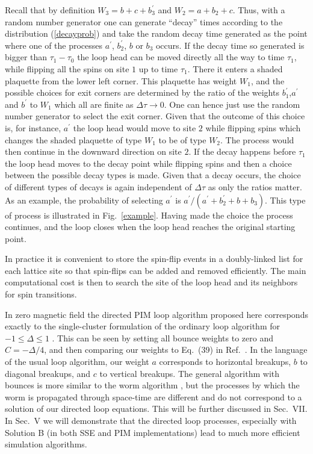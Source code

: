 \documentclass[10pt,pre,aps,twocolumn,showpacs,superscriptaddress,
floatfix]{revtex4}
\newcommand{\Deltatau}{\Delta \tau}
\begin{document}
Recall that by definition $W_3=b+c+b^\prime_3$ and $W_2=a+b_2+c$. 
Thus, with a random number generator one can generate ``decay'' times 
according to the distribution (\ref{decayprob})  and take the random decay 
time generated as the point where one of the processes $a^\prime$, 
$b^\prime_2$, $b$ or $b_3$ occurs. If the decay time so generated is bigger 
than $\tau_1-\tau_0$ the loop head can be moved directly all the way 
to time $\tau_1$, while flipping all the spins on site $1$ up to time 
$\tau_1$. There it enters a shaded plaquette from the lower left corner. 
This plaquette has weight $W_1$, and the possible choices for exit corners 
are determined by the ratio of the weights $b^\prime_1$,$a^\prime$ and 
$b^\prime$ to $W_1$ which all are finite as $\Deltatau \to 0$. One can hence 
just use the random number generator to select the exit corner. Given that the 
outcome of this choice is, for instance, $a^\prime$ 
the loop head would move to site $2$ while flipping 
spins which changes the shaded plaquette of type $W_1$ to be of type $W_2$. 
The process would then continue in the downward direction on site $2$.  
If the decay happens before $\tau_1$ the loop head moves to the decay point 
while flipping spins and then a choice between the possible decay types is 
made. Given that a decay occurs, the choice of different types of decays is 
again independent of $\Deltatau$ as only the ratios matter. As an example, 
the probability of selecting $a^\prime$ is 
$a^\prime/(a^\prime+b^\prime_2+b+b_3)$. This type of process is illustrated in
Fig.~\ref{example}. Having made the choice the process 
continues, and the loop closes when the loop head reaches the original 
starting point. 

In practice it is convenient to store the spin-flip events in a doubly-linked
list for each lattice site so that spin-flips can be added and removed 
efficiently. The main computational cost is then to search the site of
the loop head and its neighbors for spin transitions. 
   
In zero magnetic field the directed PIM loop algorithm proposed here 
corresponds exactly to the single-cluster formulation of the ordinary loop 
algorithm for $-1 \leq \Delta \leq 1$ \cite{beard,evertz}. This can be seen 
by setting all bounce weights to zero and $C=-\Delta/4$, and then comparing 
our weights to Eq.~(39) in Ref.~\cite{evertzchapter}. In the language of the 
usual loop algorithm, our weight $a$ corresponds to horizontal breakups, $b$ 
to diagonal breakups, and $c$ to vertical breakups. The general algorithm with
bounces is more similar to the worm algorithm \cite{prokofev}, but the
processes by which the worm is propagated through space-time are different
and do not correspond to a solution of our directed loop equations. This
will be further discussed in Sec.~VII. In Sec.~V we will demonstrate that the 
directed loop processes, especially with Solution B (in both SSE and PIM
implementations) lead to much more efficient simulation algorithms.
\end{document}
